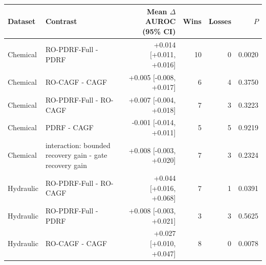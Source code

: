 \begin{tabular}{llrrrr}
\toprule
Dataset & Contrast & Mean $\Delta$ AUROC (95\% CI) & Wins & Losses & $P$ \\
\midrule
Chemical & RO-PDRF-Full - PDRF & +0.014 [+0.011, +0.016] & 10 & 0 & 0.0020 \\
Chemical & RO-CAGF - CAGF & +0.005 [-0.008, +0.017] & 6 & 4 & 0.3750 \\
Chemical & RO-PDRF-Full - RO-CAGF & +0.007 [-0.004, +0.018] & 7 & 3 & 0.3223 \\
Chemical & PDRF - CAGF & -0.001 [-0.014, +0.011] & 5 & 5 & 0.9219 \\
Chemical & interaction: bounded recovery gain - gate recovery gain & +0.008 [-0.003, +0.020] & 7 & 3 & 0.2324 \\
Hydraulic & RO-PDRF-Full - RO-CAGF & +0.044 [+0.016, +0.068] & 7 & 1 & 0.0391 \\
Hydraulic & RO-PDRF-Full - PDRF & +0.008 [-0.003, +0.021] & 3 & 3 & 0.5625 \\
Hydraulic & RO-CAGF - CAGF & +0.027 [+0.010, +0.047] & 8 & 0 & 0.0078 \\
\bottomrule
\end{tabular}